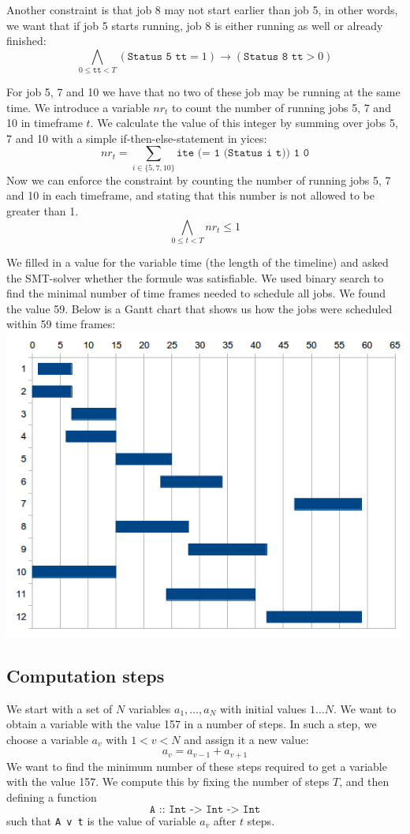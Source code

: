 \documentclass[12pt]{article}
\begin{document}
Another constraint is that job 8 may not start earlier than job 5, in other words, we want that if job 5 starts running, job 8 is either running as well or already finished:
\[ \bigwedge_{0 \le \texttt{tt} < T} (\texttt{Status 5 tt} = 1) \rightarrow (\texttt{Status 8 tt} > 0) \]

For job 5, 7 and 10 we have that no two of these job may be running at the same time. 
We introduce a variable $nr_t$ to count the number of running jobs 5, 7 and 10 in timeframe $t$.
We calculate the value of this integer by summing over jobs 5, 7 and 10 with a simple if-then-else-statement in yices: 
\[ nr_t = \sum_{i \in \{5,7,10\}} \texttt{ite (= 1 (Status i t)) 1 0} \]
Now we can enforce the constraint by counting the number of running jobs 5, 7 and 10 in each timeframe, 
and stating that this number is not allowed to be greater than 1. 
\[ \bigwedge_{0 \le t < T} nr_t \le 1\]

We filled in a value for the variable time (the length of the timeline) 
and asked the SMT-solver whether the formule was satisfiable. 
We used binary search to find the minimal number of time frames needed to schedule all jobs. 
We found the value 59. 
Below is a Gantt chart that shows us how the jobs were scheduled within 59 time frames:
\includegraphics[width=15cm]{gantchart.png}

\subsection*{Computation steps}
We start with a set of $N$ variables $a_1, \dots, a_N$ with initial values $1 \dots N$.
We want to obtain a variable with the value 157 in a number of steps. 
In such a step, we choose a variable $a_v$ with $1 < v < N$ and assign it a new value:
\[ a_v = a_{v-1} + a_{v+1} \]
We want to find the minimum number of these steps required to get a variable with the value 157.
We compute this by fixing the number of steps $T$, and then defining a function
\[\texttt{A :: Int -> Int -> Int}\]
such that \texttt{A v t} is the value of variable $a_v$ after $t$ steps.
\end{document}
